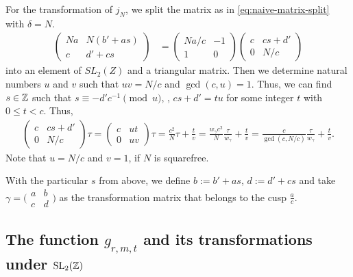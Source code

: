 \documentclass{article}
\begin{document}
For the transformation of $j_N$, we split the matrix as in
\eqref{eq:naive-matrix-split} with $\delta=N$.
\begin{align*}
  \begin{pmatrix}
    N a & N(b' + as)\\
    c & d' + cs
  \end{pmatrix}
      &=
  \begin{pmatrix}
    N a/c & -1\\
    1     &  0
  \end{pmatrix}
  \begin{pmatrix}
    c & cs+d'\\
    0 & N/c
  \end{pmatrix}
\end{align*}
into an element of $SL_2(Z)$ and a triangular matrix.
%
Then we determine natural numbers $u$ and $v$ such that $u v = N/c$
and $\gcd(c, u)=1$. Thus, we can find $s \in \mathbb{Z}$ such that
$s \equiv -d'c^{-1} \pmod{u}$, \ie, $cs + d' = tu$ for some integer
$t$ with $0\le t<c$.
%
Thus,
\begin{gather*}
  \begin{pmatrix}
    c & cs+d'\\
    0 & N/c
  \end{pmatrix} \tau
  =
  \begin{pmatrix}
    c & u t\\
    0 & u v
  \end{pmatrix} \tau
  =
  \frac{c^2}{N} \tau + \frac{t}{v}
  =
 \frac{w_\gamma c^2}{N} \frac{\tau}{w_\gamma} + \frac{t}{v}
  =
 \frac{c}{\gcd(c,N/c)} \frac{\tau}{w_\gamma} + \frac{t}{v}
  .
\end{gather*}
Note that $u=N/c$ and $v=1$, if $N$ is squarefree.

With the particular $s$ from above, we define $b:=b'+as$, $d:=d'+cs$
and take
%
$\gamma = \bigl(
\begin{smallmatrix}
  a & b\\
  c & d
\end{smallmatrix}
\bigr)$ as the transformation matrix that belongs to the cusp
$\frac{a}{c}$.


\subsection{The function $g_{r,m,t}$ and its transformations under
  $\SL2Z$}
  \label{sec:function-g_r-m-t}
\end{document}
